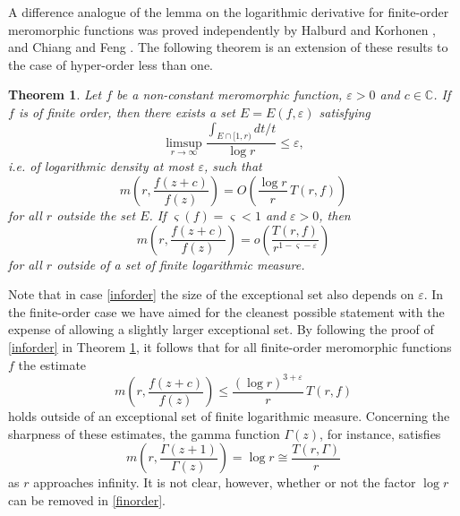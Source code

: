 \documentclass{amsart}
\newcommand{\C}{\mathbb{C}}
\newtheorem{theorem}{Theorem}%
\theoremstyle{definition}
\numberwithin{equation}{section}
\numberwithin{theorem}{section}
\begin{document}
A difference analogue of the lemma on the logarithmic derivative for finite-order meromorphic functions was proved
independently by Halburd and Kor\-ho\-nen \cite[Lemma
2.3]{halburdk:06JMAA}, \cite[Theorem 2.1]{halburdk:06AASFM} and Chiang and Feng \cite[Theorem 2.4]{chiangf:08}. The following theorem is an extension of these results to the case of hyper-order less than one.

\begin{theorem}\label{logder}
Let $f$ be a non-constant meromorphic function, $\varepsilon>0$ and $c\in\C$. If
$f$ is of finite order, then there exists a set $E=E(f, \varepsilon)$ satisfying
    \begin{equation}\label{setE}
    \limsup_{r\to\infty} \displaystyle\frac{\int_{E\cap[1,r)}
    dt/t}{\log r} \leq \varepsilon,
    \end{equation}
i.e. of logarithmic density at most $\varepsilon$, such that
    \begin{equation}\label{finorder}
    m\left(r,\frac{f(z+c)}{f(z)}\right)=O\left(\frac{\log
    r}{r}\,T(r,f)\right)
    \end{equation}
for all $r$ outside the set $E$. If $\varsigma(f)=\varsigma<1$ and $\varepsilon>0$, then
    \begin{equation}\label{inforder}
    m\left(r,\frac{f(z+c)}{f(z)}\right)=o
    \left(\frac{T(r,f)}{r^{1-\varsigma-\varepsilon}}\right)
    \end{equation}
for all $r$ outside of a set of finite logarithmic measure.
\end{theorem}

Note that in case \eqref{inforder} the size of the exceptional set also depends on $\varepsilon$.
In the finite-order case we have aimed for the cleanest possible
statement with the expense of allowing a slightly larger
exceptional set. By following the proof of \eqref{inforder} in
Theorem \ref{logder}, it follows that for all finite-order
meromorphic functions $f$ the estimate
    \begin{equation*}
    m\left(r,\frac{f(z+c)}{f(z)}\right)\leq \frac{(\log r)^{3+\varepsilon}}{r}\,T(r,f)
    \end{equation*}
holds outside of an exceptional set of finite logarithmic measure.
Concerning the sharpness of these estimates, the gamma function
$\Gamma(z)$, for instance, satisfies
    \begin{equation*}
    m\left(r,\frac{\Gamma(z+1)}{\Gamma(z)}\right) = \log r \cong
    \frac{T(r,\Gamma)}{r}
    \end{equation*}
as $r$ approaches infinity. It is not clear, however, whether or
not the factor $\log r$ can be removed in \eqref{finorder}.
\end{document}

